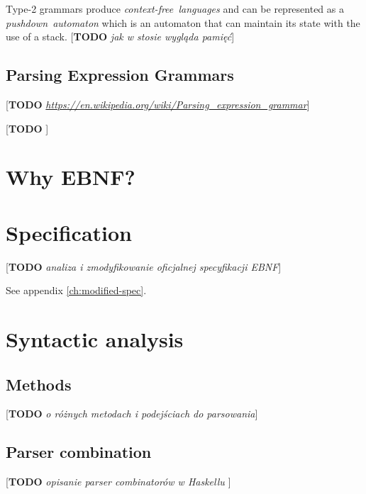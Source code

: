 \documentclass[english,engineering]{wizthesis}
\newcommand{\todo}[1]{{\color{red}[\textbf{TODO} \textit{#1}]}}
\begin{document}
Type-2 grammars produce \textit{context-free~languages} and can be represented
as a \textit{pushdown~automaton} which is an automaton that can maintain its
state with the use of a stack. \todo{jak w stosie wygląda pamięć}

\subsection{Parsing Expression Grammars}

\todo{\url{https://en.wikipedia.org/wiki/Parsing_expression_grammar}}

\todo{\cite{ford-2004}}

\section{Why EBNF?}

\section{Specification}

\todo{analiza i zmodyfikowanie oficjalnej specyfikacji EBNF}

See appendix \ref{ch:modified-spec}.

\section{Syntactic analysis} \label{sec:parsing}

\subsection{Methods}

\todo{o różnych metodach i podejściach do parsowania}

\subsection{Parser combination}

\todo{opisanie parser combinatorów w Haskellu \cite{swierstra-2009}
\cite{leijen-2001} \cite{fokker-1995}}

\end{document}
